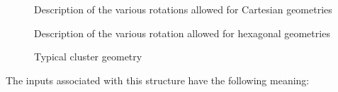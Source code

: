 \begin{figure}[h!]
\begin{center} 
\epsfxsize=8cm
\centerline{ }
\parbox{14cm}{\caption{Description of the various rotations allowed for
Cartesian geometries}\label{fig:oricart}}   
\end{center}  
\end{figure}

\begin{figure}[h!]  
\begin{center} 
\epsfxsize=11cm
\centerline{ }
\parbox{14cm}{\caption{Description of the various rotation allowed for
hexagonal geometries}\label{fig:orihex}}
\end{center}  
\end{figure}

\begin{figure}[h!]  
\begin{center} 
\epsfxsize=7cm
\centerline{ }
\parbox{14cm}{\caption{Typical cluster geometry}\label{fig:cluster}}
\end{center}  
\end{figure}

\clearpage

The inputs associated with this structure have the following meaning:

